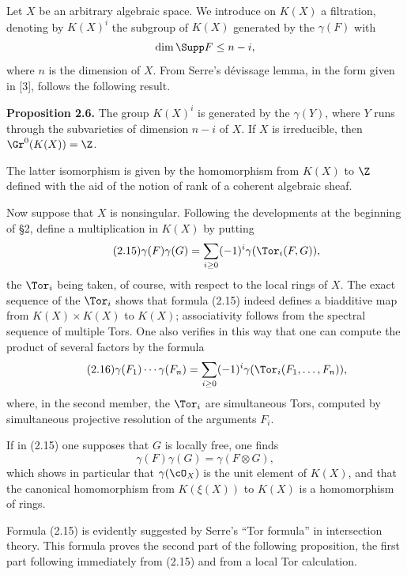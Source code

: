 Let $X$ be an arbitrary algebraic space. We introduce on $K(X)$ a filtration, denoting by $K(X)^i$ the subgroup of $K(X)$ generated by the $\gamma(F)$ with
\[
 \dim \Supp F\leq n-i,
\]
where $n$ is the dimension of $X$. From Serre's d\'evissage lemma, in the form given in [3], follows the following result.

\textbf{Proposition 2.6.} The group $K(X)^i$ is generated by the $\gamma(Y)$, where $Y$ runs through the subvarieties of dimension $n-i$ of $X$. If $X$ is irreducible, then $\Gr^0(K(X))=\Z$.

The latter isomorphism is given by the homomorphism from $K(X)$ to $\Z$ defined with the aid of the notion of rank of a coherent algebraic sheaf.

Now suppose that $X$ is nonsingular. Following the developments at the beginning of \S 2, define a multiplication in $K(X)$ by putting
\begin{equation}\tag{2.15}
 \gamma(F)\gamma(G)=\sum_{i\geq 0}(-1)^i\gamma(\Tor_i(F,G)),
\end{equation}
the $\Tor_i$ being taken, of course, with respect to the local rings of $X$. The exact sequence of the $\Tor_i$ shows that formula (2.15) indeed defines a biadditive map from $K(X)\times K(X)$ to $K(X)$; associativity follows from the spectral sequence of multiple Tors. One also verifies in this way that one can compute the product of several factors by the formula
\begin{equation}\tag{2.16}
 \gamma(F_1)\cdots\gamma(F_n)=\sum_{i\geq 0}(-1)^i\gamma(\Tor_i(F_1,\ldots,F_n)),
\end{equation}
where, in the second member, the $\Tor_i$ are simultaneous Tors, computed by simultaneous projective resolution of the arguments $F_i$.

If in (2.15) one supposes that $G$ is locally free, one finds
\begin{equation}\tag{2.15 bis}
 \gamma(F)\gamma(G)=\gamma(F\otimes G),
\end{equation}
which shows in particular that $\gamma(\cO_X)$ is the unit element of $K(X)$, and that the canonical homomorphism from $K(\xi(X))$ to $K(X)$ is a homomorphism of rings.

Formula (2.15) is evidently suggested by Serre's ``Tor formula'' in intersection theory. This formula proves the second part of the following proposition, the first part following immediately from (2.15) and from a local Tor calculation.


